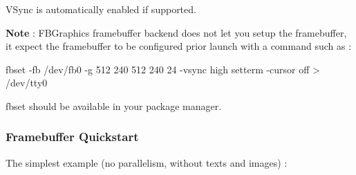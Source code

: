V\+Sync is automatically enabled if supported.

{\bfseries Note} \+: F\+B\+Graphics framebuffer backend does not let you setup the framebuffer, it expect the framebuffer to be configured prior launch with a command such as \+:


\begin{DoxyCode}
fbset -fb /dev/fb0 -g 512 240 512 240 24 -vsync high
setterm -cursor off > /dev/tty0
\end{DoxyCode}


{\ttfamily fbset} should be available in your package manager.

\subsubsection*{Framebuffer Quickstart}

The simplest example (no parallelism, without texts and images) \+:


